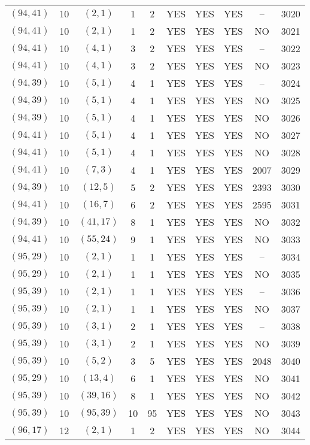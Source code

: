 \begin{longtable}{|c|c|c|c|c|c|c|c|c|c|}
$(94, 41)$ & 10 & $(2, 1)$ & 1 & 2 & YES & YES & YES & -- & 3020\\
$(94, 41)$ & 10 & $(2, 1)$ & 1 & 2 & YES & YES & YES & NO & 3021\\
$(94, 41)$ & 10 & $(4, 1)$ & 3 & 2 & YES & YES & YES & -- & 3022\\
$(94, 41)$ & 10 & $(4, 1)$ & 3 & 2 & YES & YES & YES & NO & 3023\\
$(94, 39)$ & 10 & $(5, 1)$ & 4 & 1 & YES & YES & YES & -- & 3024\\
$(94, 39)$ & 10 & $(5, 1)$ & 4 & 1 & YES & YES & YES & NO & 3025\\
$(94, 39)$ & 10 & $(5, 1)$ & 4 & 1 & YES & YES & YES & NO & 3026\\
$(94, 41)$ & 10 & $(5, 1)$ & 4 & 1 & YES & YES & YES & NO & 3027\\
$(94, 41)$ & 10 & $(5, 1)$ & 4 & 1 & YES & YES & YES & NO & 3028\\
$(94, 41)$ & 10 & $(7, 3)$ & 4 & 1 & YES & YES & YES & 2007 & 3029\\
$(94, 39)$ & 10 & $(12, 5)$ & 5 & 2 & YES & YES & YES & 2393 & 3030\\
$(94, 41)$ & 10 & $(16, 7)$ & 6 & 2 & YES & YES & YES & 2595 & 3031\\
$(94, 39)$ & 10 & $(41, 17)$ & 8 & 1 & YES & YES & YES & NO & 3032\\
$(94, 41)$ & 10 & $(55, 24)$ & 9 & 1 & YES & YES & YES & NO & 3033\\
$(95, 29)$ & 10 & $(2, 1)$ & 1 & 1 & YES & YES & YES & -- & 3034\\
$(95, 29)$ & 10 & $(2, 1)$ & 1 & 1 & YES & YES & YES & NO & 3035\\
$(95, 39)$ & 10 & $(2, 1)$ & 1 & 1 & YES & YES & YES & -- & 3036\\
$(95, 39)$ & 10 & $(2, 1)$ & 1 & 1 & YES & YES & YES & NO & 3037\\
$(95, 39)$ & 10 & $(3, 1)$ & 2 & 1 & YES & YES & YES & -- & 3038\\
$(95, 39)$ & 10 & $(3, 1)$ & 2 & 1 & YES & YES & YES & NO & 3039\\
$(95, 39)$ & 10 & $(5, 2)$ & 3 & 5 & YES & YES & YES & 2048 & 3040\\
$(95, 29)$ & 10 & $(13, 4)$ & 6 & 1 & YES & YES & YES & NO & 3041\\
$(95, 39)$ & 10 & $(39, 16)$ & 8 & 1 & YES & YES & YES & NO & 3042\\
$(95, 39)$ & 10 & $(95, 39)$ & 10 & 95 & YES & YES & YES & NO & 3043\\
$(96, 17)$ & 12 & $(2, 1)$ & 1 & 2 & YES & YES & YES & NO & 3044\\

\end{longtable}
